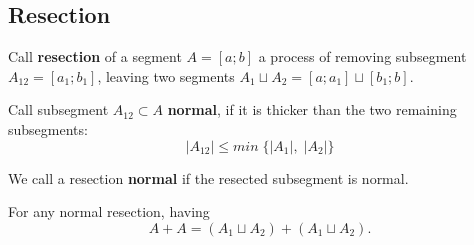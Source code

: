 \subsection{Resection}
\label{sbsc:resection}

\begin{definition}
	Call \textbf{resection} of a segment $A = [a; b]$
	a process of removing subsegment $A_{12} = [a_1; b_1]$,
	leaving two segments $A_1 \sqcup A_2 = [a; a_1] \sqcup [b_1; b]$.
\end{definition}


\begin{definition}
	Call subsegment $A_{12} \subset A$ \textbf{normal}, if it is thicker than the two remaining subsegments:
	\begin{equation}
		\label{normal_resection}
		|A_{12}| \leqslant min\;\{|A_1|,\; |A_2|\}
	\end{equation}
\end{definition}

We call a resection \textbf{normal} if the resected subsegment is normal.

\begin{proposition}
	For any normal resection, having
	\begin{equation}
		\label{sum_is_present}
		A + A = (A_1 \sqcup A_2) + (A_1 \sqcup A_2).
	\end{equation}
\end{proposition}


